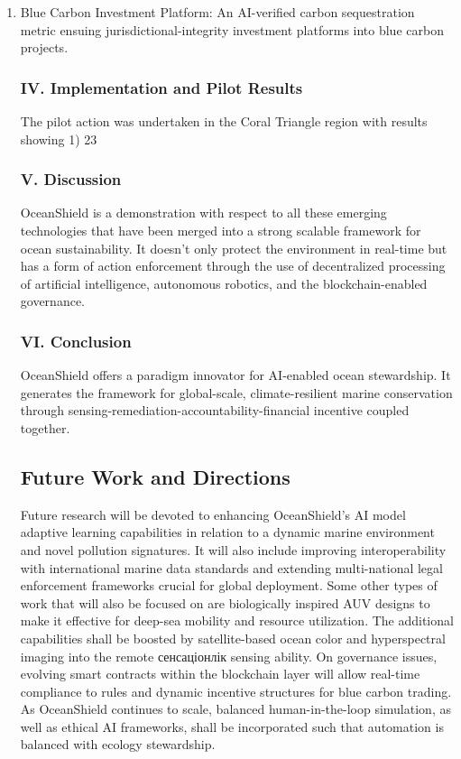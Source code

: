 \documentclass[a4paper]{article}
\begin{document}
\begin{enumerate}
    \item Blue Carbon Investment Platform: An AI-verified carbon sequestration metric ensuing jurisdictional-integrity investment platforms into blue carbon projects.


\subsubsection{IV. Implementation and Pilot Results}

The pilot action was undertaken in the Coral Triangle region with results showing 1) 23%

\subsubsection{V. Discussion}

OceanShield is a demonstration with respect to all these emerging technologies that have been merged into a strong scalable framework for ocean sustainability. It doesn't only protect the environment in real-time but has a form of action enforcement through the use of decentralized processing of artificial intelligence, autonomous robotics, and the blockchain-enabled governance.

\subsubsection{VI. Conclusion}

OceanShield offers a paradigm innovator for AI-enabled ocean stewardship. It generates the framework for global-scale, climate-resilient marine conservation through sensing-remediation-accountability-financial incentive coupled together.

\subsection{Future Work and Directions}

Future research will be devoted to enhancing OceanShield's AI model adaptive learning capabilities in relation to a dynamic marine environment and novel pollution signatures. It will also include improving interoperability with international marine data standards and extending multi-national legal enforcement frameworks crucial for global deployment. Some other types of work that will also be focused on are biologically inspired AUV designs to make it effective for deep-sea mobility and resource utilization. The additional capabilities shall be boosted by satellite-based ocean color and hyperspectral imaging into the remote сенсаціонлік sensing ability. On governance issues, evolving smart contracts within the blockchain layer will allow real-time compliance to rules and dynamic incentive structures for blue carbon trading. As OceanShield continues to scale, balanced human-in-the-loop simulation, as well as ethical AI frameworks, shall be incorporated such that automation is balanced with ecology stewardship.


\end{enumerate}
\end{document}
